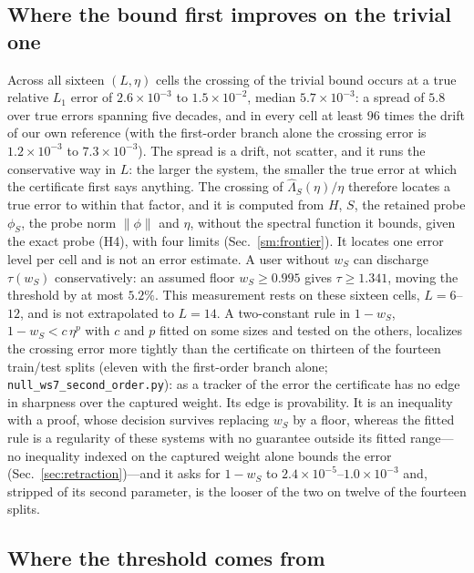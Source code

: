 \subsection{Where the bound first improves on the trivial one}
\label{sec:frontier:calib}

Across all sixteen $(L,\eta)$ cells the crossing of the trivial
bound occurs at a true relative $L_1$ error of $2.6\times10^{-3}$ to $1.5\times10^{-2}$, median
$5.7\times10^{-3}$: a spread of $5.8$ over true errors spanning five decades, and in every cell at least
$96$ times the drift of our own reference (with the first-order branch alone the crossing error is
$1.2\times10^{-3}$ to $7.3\times10^{-3}$). The spread is a drift, not scatter, and it runs the
conservative way in $L$: the larger the system, the smaller the true error at which the certificate
first says anything. The crossing of $\widehat\Lambda_S(\eta)/\eta$ therefore locates a true error to
within that factor, and it is computed from $H$, $S$, the retained probe $\phi_S$, the probe norm
$\lVert\phi\rVert$ and $\eta$, without the spectral function it bounds, given the exact probe (H4),
with four limits (Sec.~\ref{sm:frontier}). It locates one error level per cell and is not an error
estimate. A user without $w_S$ can discharge $\tau(w_S)$ conservatively: an assumed floor
$w_S\ge0.995$ gives $\tau\ge1.341$, moving the threshold by at most $5.2\%$. This measurement rests on
these sixteen cells, $L=6$--$12$, and is not extrapolated to $L=14$. A two-constant rule in $1-w_S$,
$1-w_S<c\,\eta^{p}$ with $c$ and $p$ fitted on some sizes and tested on the others, localizes the
crossing error more tightly than the certificate on thirteen of the fourteen train/test splits (eleven
with the first-order branch alone; \texttt{null\_ws7\_\allowbreak second\_order.py}): as a tracker of the
error the certificate has no edge in sharpness over the
captured weight. Its edge is provability. It is an inequality with a proof, whose decision survives
replacing $w_S$ by a floor, whereas the fitted rule is a regularity of these systems with no guarantee
outside its fitted range---no inequality indexed on the captured weight alone bounds the error
(Sec.~\ref{sec:retraction})---and it asks for $1-w_S$ to $2.4\times10^{-5}$--$1.0\times10^{-3}$ and,
stripped of its second parameter, is the looser of the two on twelve of the fourteen splits.

\subsection{Where the threshold comes from}
\label{sec:frontier:obstruction}

